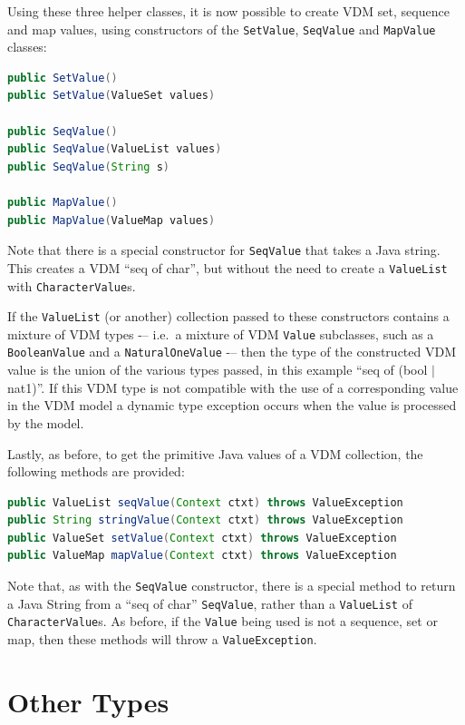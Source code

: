 \documentclass{overturerepchap}
\newcommand{\kw}[1]{{\textbf\ttfamily #1}}
\begin{document}
Using these three helper classes, it is now possible to create VDM set, sequence and map values, using constructors of the \texttt{SetValue}, \texttt{SeqValue} and \texttt{MapValue} classes:

\begin{lstlisting}[language=JAVA]
public SetValue()
public SetValue(ValueSet values)

public SeqValue()
public SeqValue(ValueList values)
public SeqValue(String s)

public MapValue()
public MapValue(ValueMap values)
\end{lstlisting}

Note that there is a special constructor for \texttt{SeqValue} that takes a Java string. This creates a VDM ``\kw{seq of char}'', but without the need to create a \texttt{ValueList} with \texttt{CharacterValue}s.

If the \texttt{ValueList} (or another) collection passed to these constructors contains a mixture of VDM types -– i.e.\ a mixture of VDM \texttt{Value} subclasses, such as a \texttt{BooleanValue} and a \texttt{NaturalOneValue} -– then the type of the constructed VDM value is the union of the various types passed, in this example ``\kw{seq of (bool} \texttt{$\mid$} \kw{nat1)}''. If this VDM type is not compatible with the use of a corresponding value in the VDM model a dynamic type exception occurs when the value is processed by the model.

Lastly, as before, to get the primitive Java values of a VDM collection, the following methods are provided:

\begin{lstlisting}[language=JAVA]
public ValueList seqValue(Context ctxt) throws ValueException
public String stringValue(Context ctxt) throws ValueException
public ValueSet setValue(Context ctxt) throws ValueException
public ValueMap mapValue(Context ctxt) throws ValueException
\end{lstlisting}

Note that, as with the \texttt{SeqValue} constructor, there is a special method to return a Java String from a ``\kw{seq of char}'' \texttt{SeqValue}, rather than a \texttt{ValueList} of \texttt{CharacterValue}s. As before, if the \texttt{Value} being used is not a sequence, set or map, then these methods will throw a \texttt{ValueException}.

\section{Other Types}
\end{document}
